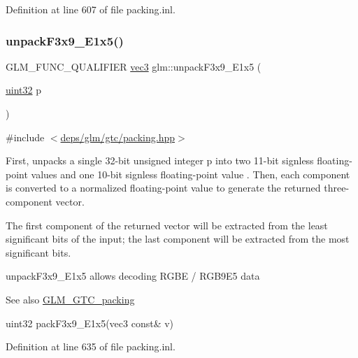 Definition at line 607 of file packing.\+inl.

\mbox{\label{group__gtc__packing_ga15d8845a31e1e55d493803d0c8cb5910}} 
\subsubsection{\texorpdfstring{unpack\+F3x9\+\_\+\+E1x5()}{unpackF3x9\_E1x5()}}
{\footnotesize\ttfamily G\+L\+M\+\_\+\+F\+U\+N\+C\+\_\+\+Q\+U\+A\+L\+I\+F\+I\+ER \hyperlink{group__core__types_ga1c47e8b3386109bc992b6c48e91b0be7}{vec3} glm\+::unpack\+F3x9\+\_\+\+E1x5 (\begin{DoxyParamCaption}\item[{\hyperlink{group__gtc__type__precision_ga202b6a53c105fcb7e531f9b443518451}{uint32}}]{p }\end{DoxyParamCaption})}



{\ttfamily \#include $<$\hyperlink{gtc_2packing_8hpp}{deps/glm/gtc/packing.\+hpp}$>$}

First, unpacks a single 32-\/bit unsigned integer p into two 11-\/bit signless floating-\/point values and one 10-\/bit signless floating-\/point value . Then, each component is converted to a normalized floating-\/point value to generate the returned three-\/component vector.

The first component of the returned vector will be extracted from the least significant bits of the input; the last component will be extracted from the most significant bits.

unpack\+F3x9\+\_\+\+E1x5 allows decoding R\+G\+BE / R\+G\+B9\+E5 data

\begin{DoxySeeAlso}{See also}
\hyperlink{group__gtc__packing}{G\+L\+M\+\_\+\+G\+T\+C\+\_\+packing} 

uint32 pack\+F3x9\+\_\+\+E1x5(vec3 const\& v) 
\end{DoxySeeAlso}


Definition at line 635 of file packing.\+inl.

\mbox{\label{group__gtc__packing_ga30d6b2f1806315bcd6047131f547d33b}} 
